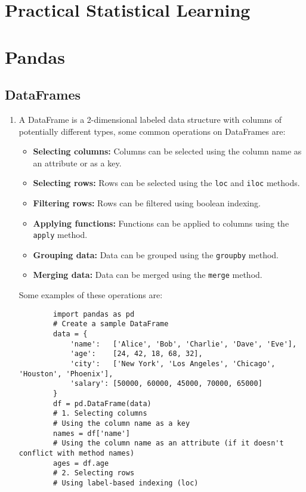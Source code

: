 \documentclass[letterpaper, 11pt]{article}
\newcommand{\1}{\mathds{1}}	%
\theoremstyle{definition}
\begin{document}
\section{Practical Statistical Learning}

\section{Pandas}
\subsection{DataFrames}
\begin{enumerate}
    \item A DataFrame is a 2-dimensional labeled data structure with columns of potentially different types, some common operations on DataFrames are:
    \begin{itemize}
        \item \textbf{Selecting columns:} Columns can be selected using the column name as an attribute or as a key.
        \item \textbf{Selecting rows:} Rows can be selected using the \texttt{loc} and \texttt{iloc} methods.
        \item \textbf{Filtering rows:} Rows can be filtered using boolean indexing.
        \item \textbf{Applying functions:} Functions can be applied to columns using the \texttt{apply} method.
        \item \textbf{Grouping data:} Data can be grouped using the \texttt{groupby} method.
        \item \textbf{Merging data:} Data can be merged using the \texttt{merge} method.
    \end{itemize}
    Some examples of these operations are:
    \begin{verbatim}
        import pandas as pd
        # Create a sample DataFrame
        data = {
            'name':   ['Alice', 'Bob', 'Charlie', 'Dave', 'Eve'],
            'age':    [24, 42, 18, 68, 32],
            'city':   ['New York', 'Los Angeles', 'Chicago', 'Houston', 'Phoenix'],
            'salary': [50000, 60000, 45000, 70000, 65000]
        }
        df = pd.DataFrame(data)
        # 1. Selecting columns
        # Using the column name as a key
        names = df['name']
        # Using the column name as an attribute (if it doesn't conflict with method names)
        ages = df.age
        # 2. Selecting rows
        # Using label-based indexing (loc)

\end{verbatim}
\end{enumerate}
\end{document}
